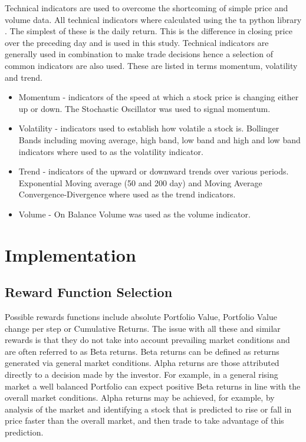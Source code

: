 \documentclass[oneside,12pt]{Classes/RoboticsLaTeX}
\begin{document}
Technical indicators are used to overcome the shortcoming of simple price and volume data. All technical indicators where calculated using the ta python library  \citep{ta-lib}.
The simplest of these is the daily return. This is  the difference in closing price over the preceding day and is used in this study.
Technical indicators are generally used in combination to make trade decisions hence a selection of  common indicators are also used. These are listed in terms momentum, volatility and trend.
\begin{itemize}
    \item Momentum - indicators of the speed at which a stock price is changing either up or down. The Stochastic Oscillator was used to signal momentum.
    \item Volatility - indicators used to establish how volatile a stock is. Bollinger Bands including moving average, high band, low band and high and low band indicators where used to as the volatility indicator.
    \item Trend - indicators of the upward or downward trends over various periods. Exponential Moving average (50 and 200 day) and Moving Average Convergence-Divergence where used as the trend indicators.
    \item Volume - On Balance Volume was used as the volume indicator.
\end{itemize}

\chapter{Implementation} \label{chap:methodology}
\section{Reward Function Selection} \label{section:rewardfunc}
Possible rewards functions include absolute Portfolio Value, Portfolio Value change per step or Cumulative Returns. The issue with all these and similar rewards is that they do not take into account prevailing market conditions and are often referred to as Beta returns. Beta returns can be defined as returns generated via general market conditions. Alpha returns are those attributed directly to a decision made by the investor.  For example, in a general rising market a well balanced Portfolio can expect positive Beta returns in line with the overall market conditions. Alpha returns may be achieved, for example, by analysis of the market and identifying  a stock that is predicted to rise or fall in price  faster than the overall market, and then trade to take advantage of this prediction.
\end{document}
